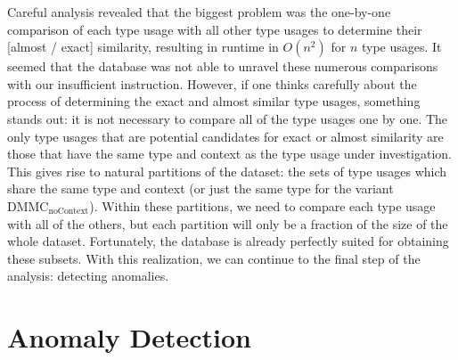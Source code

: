 Careful analysis revealed that the biggest problem was the one-by-one comparison of each type usage with all other type usages to determine their [almost / exact] similarity, resulting in runtime in $O(n^2)$ for $n$ type usages.
It seemed that the database was not able to unravel these numerous comparisons with our insufficient instruction.
However, if one thinks carefully about the process of determining the exact and almost similar type usages, something stands out: it is not necessary to compare all of the type usages one by one.
The only type usages that are potential candidates for exact or almost similarity are those that have the same type and context as the type usage under investigation.
This gives rise to natural partitions of the dataset: the sets of type usages which share the same type and context (or just the same type for the variant $\text{DMMC}_\text{noContext}$).
Within these partitions, we need to compare each type usage with all of the others, but each partition will only be a fraction of the size of the whole dataset.
Fortunately, the database is already perfectly suited for obtaining these subsets.
With this realization, we can continue to the final step of the analysis: detecting anomalies.

\section{Anomaly Detection}\label{sec:anomaly}


